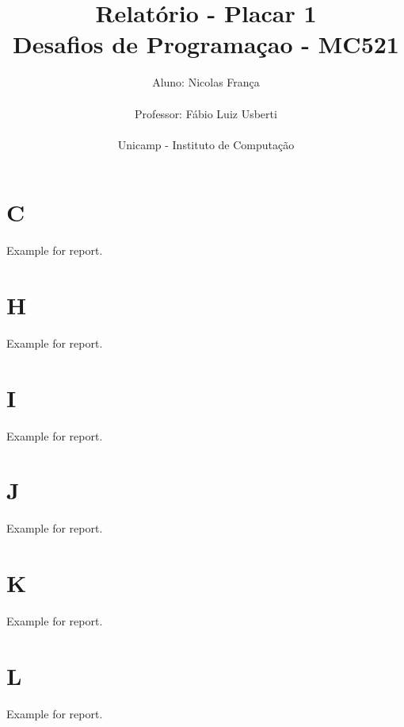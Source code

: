 \documentclass[a4paper,11pt,fleqn]{article}
\title{Relatório - Placar 1\\
Desafios de Programaçao - MC521}
\author{Aluno: Nicolas França\\\\
Professor: Fábio Luiz Usberti\\\\
Unicamp - Instituto de Computação\\}
\date{}
\begin{document}
\maketitle

\section{C}
\label{s:c}

Example for report.

\section{H}
\label{s:h}

Example for report.

\section{I}
\label{s:i}

Example for report.

\section{J}
\label{s:j}

Example for report.

\section{K}
\label{s:k}

Example for report.

\section{L}
\label{s:l}

Example for report.
\end{document}
